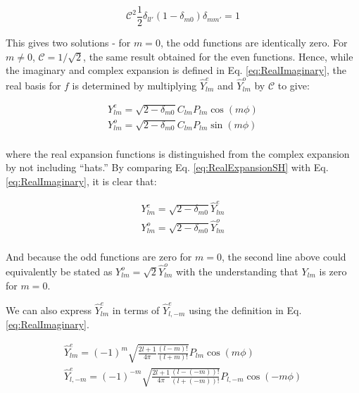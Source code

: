 \documentclass[10pt]{article}
\begin{document}
\begin{flushleft}
\begin{tcolorbox}[breakable]
\begin{equation}
\mathscr{C}^2\frac{1}{2}\delta_{ll'}(1-\delta_{m0})\delta_{mm'}=1
\end{equation} 

This gives two solutions - for \(m=0\), the odd functions are identically zero. For \(m\neq0\), \(\mathscr{C}=1/\sqrt{2}\), the same result obtained for the even functions. Hence, while the imaginary and complex expansion is defined in Eq. \eqref{eq:RealImaginary}, the real basis for \(f\) is determined by multiplying \(\hat{Y}_{lm}^e\) and \(\hat{Y}_{lm}^o\) by \(\mathscr{C}\) to give:

\begin{equation}
\label{eq:RealExpansionSH}
\begin{aligned}
Y_{lm}^e=\sqrt{2-\delta_{m0}}C_{lm}P_{lm}\cos{(m\phi)}\\
Y_{lm}^o=\sqrt{2-\delta_{m0}}C_{lm}P_{lm}\sin{(m\phi)}\\
\end{aligned}
\end{equation}

where the real expansion functions is distinguished from the complex expansion by not including ``hats.'' By comparing Eq. \eqref{eq:RealExpansionSH} with Eq. \eqref{eq:RealImaginary}, it is clear that:

\begin{equation}
\label{eq:HattoNoHat}
\begin{aligned}
Y_{lm}^e=\sqrt{2-\delta_{m0}}\hat{Y}_{lm}^e\\
Y_{lm}^o=\sqrt{2-\delta_{m0}}\hat{Y}_{lm}^o\\
\end{aligned}
\end{equation}

And because the odd functions are zero for \(m=0\), the second line above could equivalently be stated as \(Y_{lm}^o=\sqrt{2}\hat{Y}_{lm}^o\) with the understanding that \(Y_{lm}\) is zero for \(m=0\). 

\end{tcolorbox}



\begin{tcolorbox}[breakable]
We can also express \(\hat{Y}_{lm}^e\) in terms of \(\hat{Y}_{l,-m}^e\) using the definition in Eq. \eqref{eq:RealImaginary}. 

\begin{equation}
\begin{aligned}
\hat{Y}_{lm}^e=(-1)^m\sqrt{\frac{2l+1}{4\pi}\frac{(l-m)!}{(l+m)!}}P_{lm}\cos{(m\phi)}\\
\hat{Y}_{l,-m}^e=(-1)^{-m}\sqrt{\frac{2l+1}{4\pi}\frac{(l-(-m))!}{(l+(-m))!}}P_{l,-m}\cos{(-m\phi)}\\
\end{aligned}
\end{equation}


\end{tcolorbox}
\end{flushleft}
\end{document}

